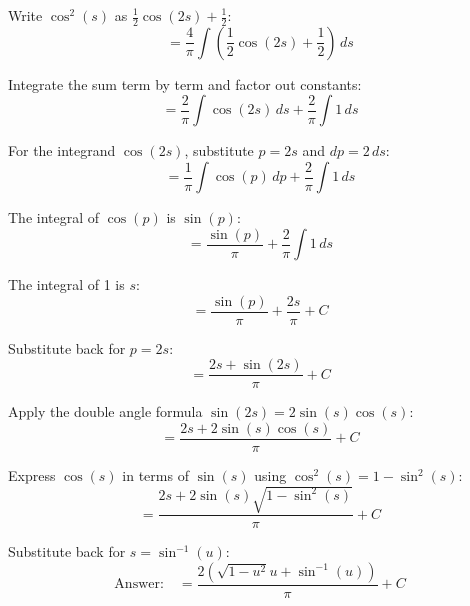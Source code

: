 \singlespacing
Write \(\cos^2(s)\) as \(\frac{1}{2} \cos(2 s) + \frac{1}{2}\):
\singlespacing
\begin{equation}
    = \frac{4}{\pi} \int \left( \frac{1}{2} \cos(2 s) + \frac{1}{2} \right) \, ds
\end{equation}

\singlespacing
Integrate the sum term by term and factor out constants:
\singlespacing
\begin{equation}
    = \frac{2}{\pi} \int \cos(2 s) \, ds + \frac{2}{\pi} \int 1 \, ds
\end{equation}

\singlespacing
For the integrand \(\cos(2 s)\), substitute \(p = 2 s\) and \(dp = 2 \, ds\):
\singlespacing
\begin{equation}
    = \frac{1}{\pi} \int \cos(p) \, dp + \frac{2}{\pi} \int 1 \, ds
\end{equation}

\singlespacing
The integral of \(\cos(p)\) is \(\sin(p)\):
\singlespacing
\begin{equation}
    = \frac{\sin(p)}{\pi} + \frac{2}{\pi} \int 1 \, ds
\end{equation}

\singlespacing
The integral of 1 is \(s\):
\singlespacing
\begin{equation}
    = \frac{\sin(p)}{\pi} + \frac{2 s}{\pi} + C
\end{equation}

\singlespacing
Substitute back for \(p = 2 s\):
\singlespacing
\begin{equation}
    = \frac{2 s + \sin(2 s)}{\pi} + C
\end{equation}

\singlespacing
Apply the double angle formula \(\sin(2 s) = 2 \sin(s) \cos(s)\):
\singlespacing
\begin{equation}
    = \frac{2 s + 2 \sin(s) \cos(s)}{\pi} + C
\end{equation}

\singlespacing
Express \(\cos(s)\) in terms of \(\sin(s)\) using \(\cos^2(s) = 1 - \sin^2(s)\):
\singlespacing
\begin{equation}
    = \frac{2 s + 2 \sin(s) \sqrt{1 - \sin^2(s)}}{\pi} + C
\end{equation}

\singlespacing
Substitute back for \(s = \sin^{-1}(u)\):
\singlespacing
\begin{equation}
    \text{Answer:} \quad = \frac{2 (\sqrt{1 - u^2} u + \sin^{-1}(u))}{\pi} + C
\end{equation}

